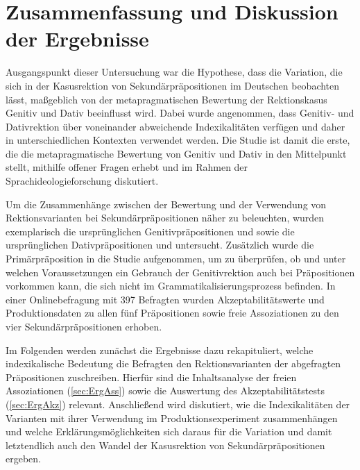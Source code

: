 \chapter{Zusammenfassung und Diskussion der Ergebnisse} \label{cha:Disk}
Ausgangspunkt dieser Untersuchung war die Hypothese, dass die Variation, %
die sich in der Kasusrektion von Sekundärpräpositionen im Deutschen beobachten lässt, maßgeblich von der metapragmatischen Bewertung der Rektionskasus Genitiv und Dativ beeinflusst wird. 
Dabei wurde angenommen, dass Genitiv- und Dativrektion über voneinander abweichende Indexikalitäten verfügen und daher in unterschiedlichen Kontexten verwendet werden. 
Die Studie ist damit die erste, die die metapragmatische Bewertung von Genitiv und Dativ in den Mittelpunkt stellt, mithilfe offener Fragen erhebt und im Rahmen der Sprachideologieforschung diskutiert. 

Um die Zusammenhänge zwischen der Bewertung und der Verwendung von Rektionsvarianten bei Sekundärpräpositionen näher zu beleuchten, wurden exemplarisch die ursprünglichen Genitivpräpositionen \wegen{} und \waehrend{} sowie die ursprünglichen Dativpräpositionen \dank{} und \gegenueber{} untersucht.
Zusätzlich wurde die Primärpräposition  in die Studie aufgenommen, um zu überprüfen, ob und unter welchen Voraussetzungen ein Gebrauch der Genitivrektion auch bei Präpositionen vorkommen kann, die sich nicht im Grammatikalisierungsprozess befinden. 
In einer Onlinebefragung mit 397 Befragten wurden Akzeptabilitätswerte und Produktionsdaten zu allen fünf Präpositionen sowie freie Assoziationen zu den vier Sekundärpräpositionen erhoben.
  
Im Folgenden werden zunächst die Ergebnisse dazu rekapituliert, welche indexikalische Bedeutung die Befragten den Rektionsvarianten der abgefragten Präpositionen zuschreiben.
Hierfür sind die Inhaltsanalyse der freien Assoziationen (\autoref{sec:ErgAss}) sowie die Auswertung des Akzeptabilitätstests (\autoref{sec:ErgAkz}) relevant. 
Anschließend wird diskutiert, wie die Indexikalitäten der Varianten mit ihrer Verwendung im Produktionsexperiment zusammenhängen und welche Erklärungsmöglichkeiten sich daraus für die Variation und %
damit letztendlich auch den Wandel %
der Kasusrektion von Sekundärpräpositionen ergeben. 

